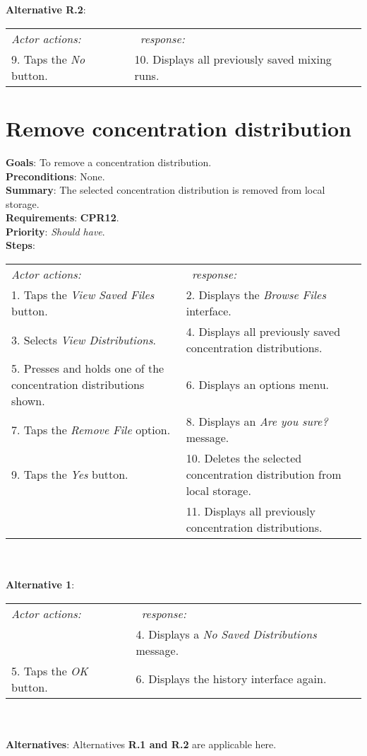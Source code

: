     \\
         \\\textbf{Alternative R.2}: \\
        \begin{tabular}{ p{} p{} }
  	\emph{Actor actions:} & \emph{\projectname\ response:} \\
    9. Taps the \emph{No} button. & 10. Displays all previously saved mixing runs. \\
    \end{tabular}

\section{Remove concentration distribution}
 \label{removedist}
  \textbf{Goals}: To remove a concentration distribution.\\
  \textbf{Preconditions}: None.\\
  \textbf{Summary}: The selected concentration distribution is removed from local storage.\\
  \textbf{Requirements}: \textbf{CPR12}.\\
  \textbf{Priority}: \emph{Should have}.\\
  \textbf{Steps}: \\
    \begin{tabular}{ p{} p{} }
  	\emph{Actor actions:} & \emph{\projectname\ response:} \\
    1. Taps the \emph{View Saved Files} button. & 2. Displays the \emph{Browse Files} interface.\\
    3. Selects \emph{View Distributions}. & 4. Displays all previously saved concentration distributions.\\
    5. Presses and holds one of the concentration distributions shown. & 6. Displays an options menu. \\
    7. Taps the \emph{Remove File} option. & 8. Displays an \emph{Are you sure?} message.\\
    9. Taps the \emph{Yes} button. & 10. Deletes the selected concentration distribution from local storage. \\
     & 11. Displays all previously concentration distributions.\\
    \end{tabular}
                \\
     \\\textbf{Alternative 1}: \\
    \begin{tabular}{ p{} p{} }
  	\emph{Actor actions:} & \emph{\projectname\ response:} \\
            & 4. Displays a \emph{No Saved Distributions} message. \\
    5. Taps the \emph{OK} button. & 6. Displays the history interface again. \\
    \end{tabular}
    \\
    \\\textbf{Alternatives}: Alternatives \textbf{R.1 and R.2} are applicable here.

